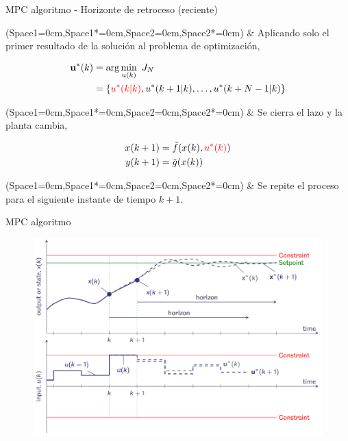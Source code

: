 \documentclass[8pt]{beamer}
\begin{document}
\begin{frame}[fragile]{MPC algoritmo - Horizonte de retroceso (reciente)}

	\Activate
	\begin{easylist}[itemize] \ListProperties(Space1=0cm,Space1*=0cm,Space2=0cm,Space2*=0cm)
		& Aplicando solo el primer resultado de la solución al problema de optimización,
	\end{easylist}
	\Deactivate
	\begin{equation*}
	\begin{aligned}
		\mathbf{u}^*(k) & = \mathrm{arg}\min_{u(k)}~ J_N      \\
              			& = \left\{ { \color{red} u^*(k|k) } ,u^*(k+1|k),\dots,u^*(k+N-1|k) \right\}
	\end{aligned}
	\end{equation*}
	\Activate
	\begin{easylist}[itemize] \ListProperties(Space1=0cm,Space1*=0cm,Space2=0cm,Space2*=0cm)
		& Se cierra el lazo y la planta cambia,	
	\end{easylist}
	\Deactivate
	\begin{equation*}
	\begin{aligned}
		x(k+1) & = \tilde{f}(x(k),{ \color{red} u^*(k) }) \\
		y(k+1) & = \tilde{g}(x(k))
	\end{aligned}
	\end{equation*}
	\Activate
	\begin{easylist}[itemize] \ListProperties(Space1=0cm,Space1*=0cm,Space2=0cm,Space2*=0cm)
		& Se repite el proceso para el siguiente instante de tiempo $k+1$.	
	\end{easylist}
	\Deactivate
\end{frame}

\begin{frame}[fragile]{MPC algoritmo}
	\begin{figure}[!ht]
		\centering
		\includegraphics[width=1\linewidth]{figures/MPC_basic_4a}	
	\end{figure}
\end{frame}
\end{document}
